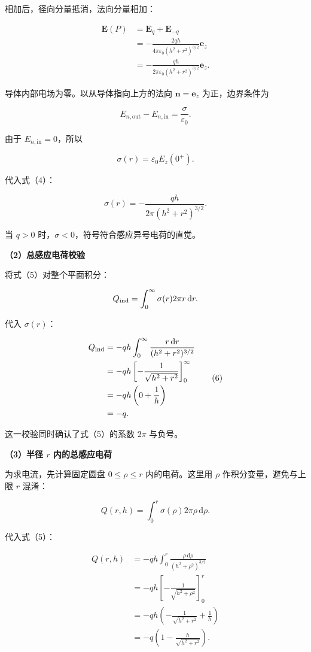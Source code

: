 \documentclass[12pt,a4paper,UTF8]{ctexart}
\begin{document}
相加后，径向分量抵消，法向分量相加：

\[
\begin{aligned}
\bm E(P)
&=\bm E_q+\bm E_{-q}\\
&=-\frac{2qh}{4\pi\varepsilon_0(h^2+r^2)^{3/2}}\bm e_z\\
&=-\frac{qh}{2\pi\varepsilon_0(h^2+r^2)^{3/2}}\bm e_z.
\end{aligned}
\tag{4}
\]

导体内部电场为零。以从导体指向上方的法向 \(\bm n=\bm e_z\)
为正，边界条件为

\[
E_{n,\mathrm{out}}-E_{n,\mathrm{in}}=\frac\sigma{\varepsilon_0}.
\]

由于 \(E_{n,\mathrm{in}}=0\)，所以

\[
\sigma(r)=\varepsilon_0E_z(0^+).
\]

代入式（4）：

\[
\boxed{
\sigma(r)
=-\frac{qh}{2\pi(h^2+r^2)^{3/2}}
}.
\tag{5}
\]

当 \(q>0\) 时，\(\sigma<0\)，符号符合感应异号电荷的直觉。

\textbf{（2）总感应电荷校验}

将式（5）对整个平面积分：

\[
Q_{\rm ind}
=\int_0^\infty\sigma(r)2\pi r\,\mathrm dr.
\]

代入 \(\sigma(r)\)：

\[
\begin{aligned}
Q_{\rm ind}
&=-qh\int_0^\infty
\frac{r\,\mathrm dr}{(h^2+r^2)^{3/2}}\\
&=-qh\left[-\frac1{\sqrt{h^2+r^2}}\right]_0^\infty\\
&=-qh\left(0+\frac1h\right)\\
&=-q.
\end{aligned}
\tag{6}
\]

这一校验同时确认了式（5）的系数 \(2\pi\) 与负号。

\textbf{（3）半径 \(r\) 内的总感应电荷}

为求电流，先计算固定圆盘 \(0\leq\rho\leq r\) 内的电荷。这里用 \(\rho\)
作积分变量，避免与上限 \(r\) 混淆：

\[
Q(r,h)
=\int_0^r\sigma(\rho)2\pi\rho\,\mathrm d\rho.
\tag{7}
\]

代入式（5）：

\[
\begin{aligned}
Q(r,h)
&=-qh\int_0^r
\frac{\rho\,\mathrm d\rho}{(h^2+\rho^2)^{3/2}}\\
&=-qh\left[-\frac1{\sqrt{h^2+\rho^2}}\right]_0^r\\
&=-qh\left(-\frac1{\sqrt{h^2+r^2}}+\frac1h\right)\\
&=-q\left(1-\frac{h}{\sqrt{h^2+r^2}}\right).
\end{aligned}
\tag{8}
\]
\end{document}
